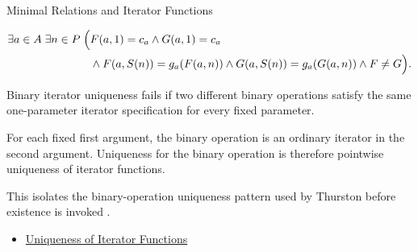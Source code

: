 \begin{topicbox}{Minimal Relations and Iterator Functions}

\begin{remark*}
\[
\begin{aligned}
\exists a\in A\;\exists n\in P\;\Bigl(&
F(a,1)=c_a\land G(a,1)=c_a\\
&\land F(a,S(n))=g_a(F(a,n))
\land G(a,S(n))=g_a(G(a,n))
\land F\neq G\Bigr).
\end{aligned}
\]
\end{remark*}

\begin{remark*}
Binary iterator uniqueness fails if two different binary operations satisfy
the same one-parameter iterator specification for every fixed parameter.
\end{remark*}

\begin{remark*}[Interpretation]
For each fixed first argument, the binary operation is an ordinary iterator in
the second argument. Uniqueness for the binary operation is therefore
pointwise uniqueness of iterator functions.
\end{remark*}

\begin{remark*}
This isolates the binary-operation uniqueness pattern used by Thurston before
existence is invoked \citep{thurston1956numbersystem}.
\end{remark*}

\begin{remark*}[Dependencies]
\begin{itemize}
  \item \hyperref[lem:uniqueness-of-iterator-functions]{Uniqueness of Iterator Functions}
\end{itemize}
\end{remark*}
\end{topicbox}

